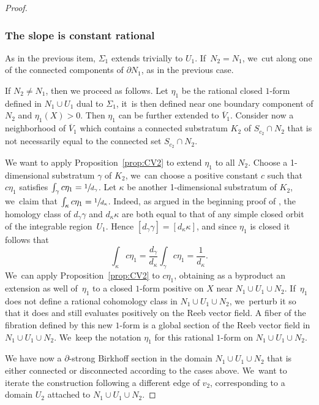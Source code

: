\documentclass[11pt]{article}
\theoremstyle{definition}
\begin{document}
\begin{proof}
\subsubsection*{The slope is constant rational} As in the previous item, $\Sigma_1$ extends trivially to $U_1$. If~$N_2=N_1$, we~cut along one of the connected components of $\partial N_1$, as in the previous case.

If $N_2\neq N_1$, then we proceed as follows. Let $\eta_1$ be the rational closed $1$-form defined in $N_1\cup U_1$ dual to $\Sigma_1$, it~is then defined near one boundary component of $N_2$ and $\eta_1(X)>0$. Then $\eta_1$ can be further extended to $\overline V_1$. Consider now a neighborhood of $\overline{V}_1$ which contains a connected substratum $K_2$ of $S_{c_2}\cap N_2$ that is not necessarily equal to the connected set $S_{c_2}\cap N_2$.

We want to apply Proposition~\ref{prop:CV2} to extend $\eta_1$ to all $N_2$. Choose a 1-dimensional substratum $\gamma$ of $K_2$, we~can choose a positive constant $c$ such that $c\eta_1$ satisfies $\int_\gamma c\eta_1=\sfrac{1}{d_{\gamma}}$. Let $\kappa$ be another 1-dimensional substratum of $K_2$, we~claim that $\int_{\kappa} c\eta_1=\sfrac{1}{d_{\kappa}}$. Indeed, as argued in the beginning proof of \cite[Prop.\,3.2]{CV2}, the homology class of $d_{\gamma}\gamma$ and $d_{\kappa}\kappa$ are both equal to that of any simple closed orbit of the integrable region~$U_1$. Hence $[d_{\gamma}\gamma]=[d_{\kappa}\kappa]$, and since $\eta_1$ is closed it follows that
\[
\int_{\kappa} c\eta_1= \frac{d_{\gamma}}{d_{\kappa}} \int_\gamma c\eta_1=\frac{1}{d_{\kappa}}.
\]
We~can apply Proposition~\ref{prop:CV2} to $c\eta_1$, obtaining as a byproduct an extension as well of~$\eta_1$ to a closed $1$-form positive on $X$ near $N_1\cup U_1\cup N_2$. If~$\eta_1$ does not define a rational cohomology class in $N_1\cup U_1\cup N_2$, we~perturb it so that it does and still evaluates positively on the Reeb vector field. A fiber of the fibration defined by this new $1$-form is a global section of the Reeb vector field in $N_1\cup U_1\cup N_2$. We~keep the notation $\eta_1$ for this rational $1$-form on $N_1\cup U_1\cup N_2$.

We have now a $\partial$-strong Birkhoff section in the domain $N_1\cup U_1\cup N_2$ that is either connected or disconnected according to the cases above. We~want to iterate the construction following a different edge of $v_2$, corresponding to a domain $U_2$ attached to $N_1\cup U_1\cup N_2$.


\end{proof}
\end{document}
